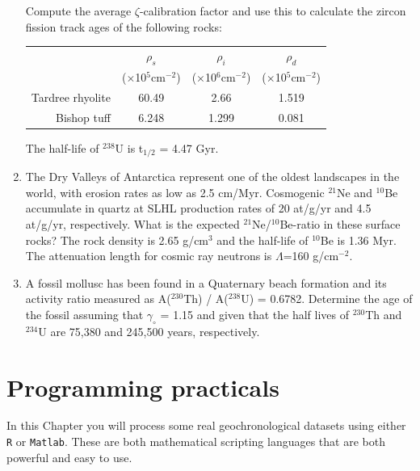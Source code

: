 \documentclass{book}
\begin{document}
\begin{enumerate}
Compute the average $\zeta$-calibration factor and use this to
calculate the zircon fission track ages of the following rocks:

\begin{table}[!ht]
\centering
\begin{tabular}{r@{~}c@{~}c@{~}c}
~ & $\rho_s$ & $\rho_i$ & $\rho_d$ \\
~ & ($\times$10$^5$cm$^{-2}$) & ($\times$10$^6$cm$^{-2}$) & ($\times$10$^5$cm$^{-2}$)\\
\hline
Tardree rhyolite & 60.49 & 2.66 & 1.519 \\
Bishop tuff & 6.248 & 1.299 & 0.081 \\
\end{tabular}
\end{table}

The half-life of $^{238}$U is t$_{1/2}$ = 4.47 Gyr.\\

\item The Dry Valleys of Antarctica represent one of the oldest
  landscapes in the world, with erosion rates as low as 2.5
  cm/Myr. Cosmogenic $^{21}$Ne and $^{10}$Be accumulate in quartz at
  SLHL production rates of 20 at/g/yr and 4.5 at/g/yr,
  respectively. What is the expected $^{21}$Ne/$^{10}$Be-ratio in
  these surface rocks? The rock density is 2.65 g/cm$^{3}$ and the
  half-life of $^{10}$Be is 1.36 Myr. The attenuation length for
  cosmic ray neutrons is $\Lambda$=160
  g/cm$^{-2}$. 

\item A fossil mollusc has been found in a Quaternary beach formation
  and its activity ratio measured as A($^{230}$Th) / A($^{238}$U) =
  0.6782. Determine the age of the fossil assuming that $\gamma_\circ$
  = 1.15 and given that the half lives of $^{230}$Th and $^{234}$U are
  75,380 and 245,500 years,
  respectively. 

\end{enumerate}

\chapter{Programming practicals}
\label{sec:programming}

In this Chapter you will process some real geochronological datasets
using either \texttt{R} or \texttt{Matlab}. These are both
mathematical scripting languages that are both powerful and easy to
use.\\
\end{document}
